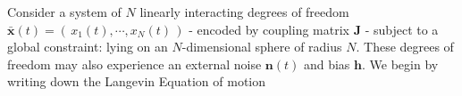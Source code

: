 Consider a system of $N$ linearly interacting degrees of freedom $\mathbf{\bar x}(t) = \left(\,x_1(t),\cdots, x_N(t)\,\right)$ - encoded by coupling matrix $\mathbf{J}$ - subject to a global constraint: lying on an $N$-dimensional sphere of radius $N$. These degrees of freedom may also experience an external noise $\mathbf{n}(t)$ and bias $\mathbf{h}$. We begin by writing down the Langevin Equation of motion